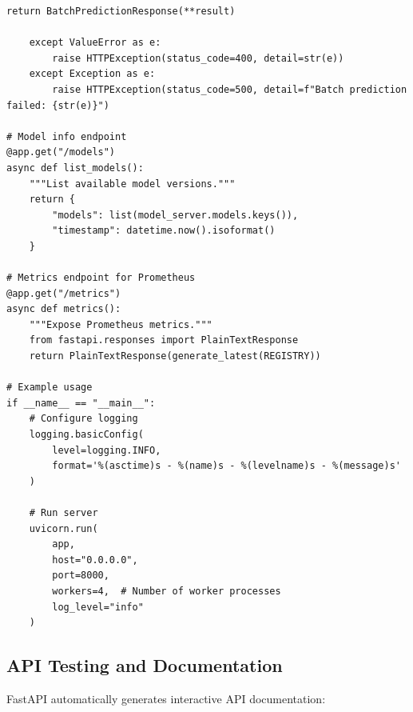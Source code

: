 \begin{lstlisting}[style=python, caption={Production-Grade FastAPI Model Serving}]
        return BatchPredictionResponse(**result)

    except ValueError as e:
        raise HTTPException(status_code=400, detail=str(e))
    except Exception as e:
        raise HTTPException(status_code=500, detail=f"Batch prediction failed: {str(e)}")

# Model info endpoint
@app.get("/models")
async def list_models():
    """List available model versions."""
    return {
        "models": list(model_server.models.keys()),
        "timestamp": datetime.now().isoformat()
    }

# Metrics endpoint for Prometheus
@app.get("/metrics")
async def metrics():
    """Expose Prometheus metrics."""
    from fastapi.responses import PlainTextResponse
    return PlainTextResponse(generate_latest(REGISTRY))

# Example usage
if __name__ == "__main__":
    # Configure logging
    logging.basicConfig(
        level=logging.INFO,
        format='%(asctime)s - %(name)s - %(levelname)s - %(message)s'
    )

    # Run server
    uvicorn.run(
        app,
        host="0.0.0.0",
        port=8000,
        workers=4,  # Number of worker processes
        log_level="info"
    )
\end{lstlisting}

\subsection{API Testing and Documentation}

FastAPI automatically generates interactive API documentation:

